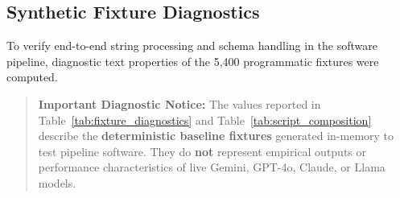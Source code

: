 \documentclass[11pt,a4paper]{article}
\begin{document}
\subsection{Synthetic Fixture Diagnostics}
\label{sec:fixture_diagnostics}

To verify end-to-end string processing and schema handling in the software pipeline, diagnostic text properties of the 5,400 programmatic fixtures were computed.

\begin{quote}
\textbf{Important Diagnostic Notice:} The values reported in Table~\ref{tab:fixture_diagnostics} and Table~\ref{tab:script_composition} describe the \textbf{deterministic baseline fixtures} generated in-memory to test pipeline software. They do \textbf{not} represent empirical outputs or performance characteristics of live Gemini, GPT-4o, Claude, or Llama models.
\end{quote}
\end{document}
